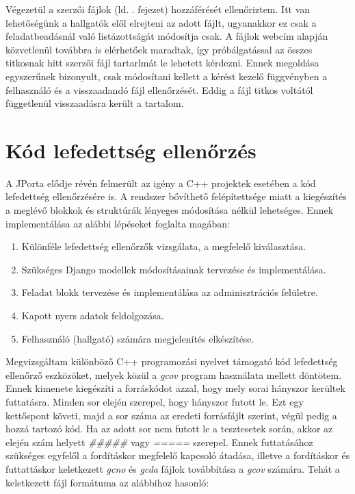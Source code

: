 Végezetül a szerzői fájlok (ld. . fejezet) hozzáférését ellenőriztem. Itt van lehetőségünk a hallgatók elől elrejteni az adott fájlt, ugyanakkor ez csak a feladatbeadásnál való listázottságát módosítja csak. A fájlok webcím alapján közvetlenül továbbra is elérhetőek maradtak, így próbálgatással az összes titkosnak hitt szerzői fájl tartarlmát le lehetett kérdezni. Ennek megoldása egyszerűnek bizonyult, csak módosítani kellett a kérést kezelő függvényben a felhasználó és a visszaadandó fájl ellenőrzését. Eddig a fájl titkos voltától függetlenül visszaadásra került a tartalom.

\section{Kód lefedettség ellenőrzés}

A JPorta elődje révén felmerült az igény a C++ projektek esetében a kód lefedettség ellenőrzésére is. A rendszer bővíthető felépítettsége miatt a kiegészítés a meglévő blokkok és struktúrák lényeges módosítása nélkül lehetséges. Ennek implementálása az alábbi lépéseket foglalta magában:

\begin{enumerate}
    \item Különféle lefedettség ellenőrzők vizsgálata, a megfelelő kiválasztása.
    \item Szükséges Django modellek módosításainak tervezése és implementálása.
    \item Feladat blokk tervezése és implementálása az adminisztrációs felületre.
    \item Kapott nyers adatok feldolgozása.
    \item Felhasználó (hallgató) számára megjelenítés elkészítése.
\end{enumerate}

Megvizsgáltam különböző C++ programozási nyelvet támogató kód lefedettség ellenőrző eszközöket, melyek közül a \textit{gcov} program használata mellett döntötem. Ennek kimenete kiegészíti a forráskódot azzal, hogy mely sorai hányszor kerültek futtatásra. Minden sor elején szerepel, hogy hányszor futott le. Ezt egy kettőspont követi, majd a sor száma az eredeti forrásfájlt szerint, végül pedig a hozzá tartozó kód. Ha az adott sor nem futott le a tesztesetek során, akkor az elején szám helyett \textit{\#\#\#\#\#} vagy \textit{=====} szerepel. Ennek futtatásához szükséges egyfelől a fordításkor megfelelő kapcsoló átadása, illetve a fordításkor és futtattáskor keletkezett \textit{gcno} és \textit{gcda} fájlok továbbítása a \textit{gcov} számára. Tehát a keletkezett fájl formátuma az alábbihoz hasonló:

